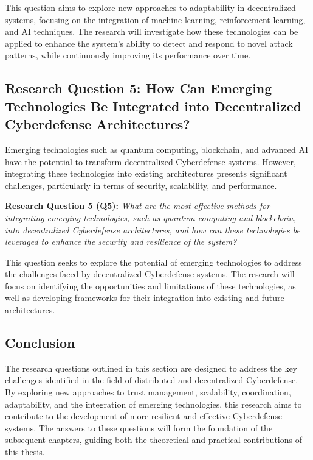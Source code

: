 This question aims to explore new approaches to adaptability in decentralized systems, focusing on the integration of machine learning, reinforcement learning, and AI techniques. The research will investigate how these technologies can be applied to enhance the system's ability to detect and respond to novel attack patterns, while continuously improving its performance over time.

\subsection{Research Question 5: How Can Emerging Technologies Be Integrated into Decentralized Cyberdefense Architectures?}

Emerging technologies such as quantum computing, blockchain, and advanced AI have the potential to transform decentralized Cyberdefense systems. However, integrating these technologies into existing architectures presents significant challenges, particularly in terms of security, scalability, and performance.

\textbf{Research Question 5 (Q5):} \textit{What are the most effective methods for integrating emerging technologies, such as quantum computing and blockchain, into decentralized Cyberdefense architectures, and how can these technologies be leveraged to enhance the security and resilience of the system?}

This question seeks to explore the potential of emerging technologies to address the challenges faced by decentralized Cyberdefense systems. The research will focus on identifying the opportunities and limitations of these technologies, as well as developing frameworks for their integration into existing and future architectures.

\subsection{Conclusion}

The research questions outlined in this section are designed to address the key challenges identified in the field of distributed and decentralized Cyberdefense. By exploring new approaches to trust management, scalability, coordination, adaptability, and the integration of emerging technologies, this research aims to contribute to the development of more resilient and effective Cyberdefense systems. The answers to these questions will form the foundation of the subsequent chapters, guiding both the theoretical and practical contributions of this thesis.



